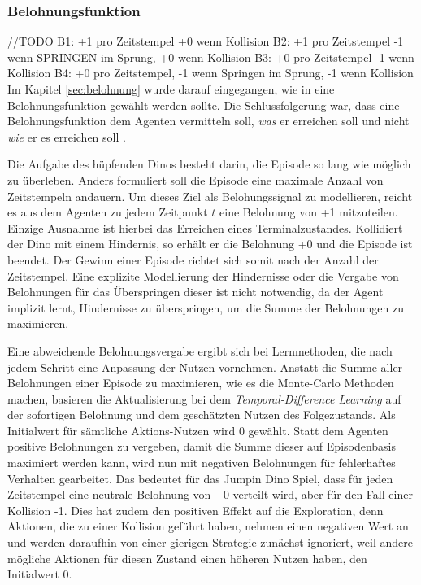 \subsubsection{Belohnungsfunktion}\label{sec:JDbelohnungsfunktion}
//TODO
B1: +1 pro Zeitstempel +0 wenn Kollision
B2: +1 pro Zeitstempel -1 wenn SPRINGEN im Sprung, +0 wenn Kollision
B3: +0 pro Zeitstempel -1 wenn Kollision
B4: +0 pro Zeitstempel, -1 wenn Springen im Sprung, -1 wenn Kollision
Im Kapitel \ref{sec:belohnung} wurde darauf eingegangen, wie in eine Belohnungsfunktion gewählt werden sollte. Die Schlussfolgerung war, dass eine Belohnungsfunktion dem Agenten vermitteln soll, \textit{was} er erreichen soll und nicht \textit{wie} er es erreichen soll \cite[S.~54]{Sutton1998}.
\par 
Die Aufgabe des hüpfenden Dinos besteht darin, die Episode so lang wie möglich zu überleben. Anders formuliert soll die Episode eine maximale Anzahl von Zeitstempeln andauern. Um dieses Ziel als Belohungssignal zu modellieren, reicht es aus dem Agenten zu jedem Zeitpunkt $t$ eine Belohnung von +1 mitzuteilen. Einzige Ausnahme ist hierbei das Erreichen eines Terminalzustandes. Kollidiert der Dino mit einem Hindernis, so erhält er die Belohnung +0 und die Episode ist beendet. Der Gewinn einer Episode richtet sich somit nach der Anzahl der Zeitstempel. Eine explizite Modellierung der Hindernisse oder die Vergabe von Belohnungen für das Überspringen dieser ist nicht notwendig, da der Agent implizit lernt, Hindernisse zu überspringen, um die Summe der Belohnungen zu maximieren. 
\par 
Eine abweichende Belohnungsvergabe ergibt sich bei Lernmethoden, die nach jedem Schritt eine Anpassung der Nutzen vornehmen. Anstatt die Summe aller Belohnungen einer Episode zu maximieren, wie es die Monte-Carlo Methoden machen, basieren die Aktualisierung bei dem \textit{Temporal-Difference Learning} auf der sofortigen Belohnung und dem geschätzten Nutzen des Folgezustands. Als Initialwert für sämtliche Aktions-Nutzen wird 0 gewählt. Statt dem Agenten positive Belohnungen zu vergeben, damit die Summe dieser auf Episodenbasis maximiert werden kann, wird nun mit negativen Belohnungen für fehlerhaftes Verhalten gearbeitet. Das bedeutet für das Jumpin Dino Spiel, dass für jeden Zeitstempel eine neutrale Belohnung von +0 verteilt wird, aber für den Fall einer Kollision -1. Dies hat zudem den positiven Effekt auf die Exploration, denn Aktionen, die zu einer Kollision geführt haben, nehmen einen negativen Wert an und werden daraufhin von einer gierigen Strategie zunächst ignoriert, weil andere mögliche Aktionen für diesen Zustand einen höheren Nutzen haben, den Initialwert 0.
